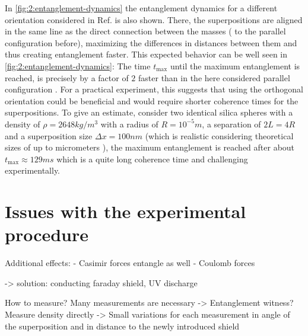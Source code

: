In \cref{fig:2:entanglement-dynamics} the entanglement dynamics for a different orientation considered in Ref. \cite{Pedernales_2023} is also shown. 
There, the superpositions are aligned in the same line as the direct connection between the masses ( to the parallel configuration before), maximizing the differences in distances between them and thus creating entanglement faster. This expected behavior can be well seen in \cref{fig:2:entanglement-dynamics}: The time $t_\mathrm{max}$ until the maximum entanglement is reached, is precisely by a factor of $2$ faster than in the here considered parallel configuration \cite{Pedernales_2023}. 
For a practical experiment, this suggests that using the orthogonal orientation could be beneficial and would require shorter coherence times for the superpositions.
To give an estimate, consider two identical silica spheres with a density of $\rho=2648\si{kg/m^3}$ with a radius of $R=10^{-5}\si{m}$, a separation of $2L = 4R$ and a superposition size $\Delta x = 100\si{nm}$ (which is realistic considering theoretical sizes of up to micrometers \cite{Bose_2017}), the maximum entanglement is reached after about $t_\mathrm{max} \approx 129\si{ms}$ which is a quite long coherence time and challenging experimentally.


\section{Issues with the experimental procedure}

Additional effects:
- Casimir forces entangle as well
- Coulomb forces

-> solution: conducting faraday shield, UV discharge \cite{Kamp_2020}

How to measure? Many measurements are necessary -> Entanglement witness? Measure density directly -> Small variations for each measurement in angle of the superposition and in distance to the newly introduced shield